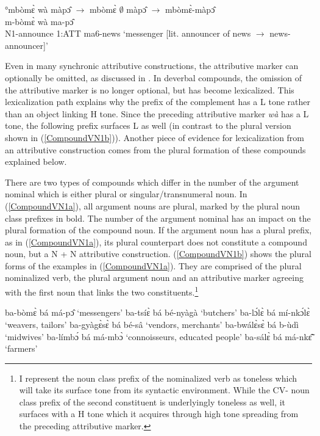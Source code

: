 \begin{exe}
\ex\label{CompoundVN} 
\gll  °mbòmɛ̀ wà màpɔ̂  $\rightarrow$ mbòmɛ̀ $\emptyset$ màpɔ̂  $\rightarrow$    mbòmɛ̀-màpɔ̂  \\
 	m-bòmɛ̀ wà ma-pɔ̂ \\
	N1-announce 1:ATT ma6-news 
\glt `messenger [lit. announcer of news $\rightarrow$ news-announcer]'
\end{exe}

\noindent Even in many synchronic attributive constructions, the attributive marker can optionally be omitted, as discussed in . In deverbal compounds, the omission of the attributive marker is no longer optional, but has become lexicalized. This lexicalization path explains why the prefix of the complement has a L tone rather than an object linking H tone. Since the preceding attributive marker {\itshape wà} has a L tone, the following prefix surfaces L as well (in contrast to the plural version shown in (\ref{CompoundVN1b})).   Another piece of evidence for lexicalization from an attributive construction comes from the plural formation of these compounds explained below. 


There are two types of  compounds which differ in the number of the argument nominal which is either plural or singular/transnumeral noun. In (\ref{CompoundVN1a}), all argument nouns are plural, marked by the plural noun class prefixes in bold.
The number of the argument nominal has an impact on the plural formation of the compound noun. If the argument noun has a plural prefix, as in (\ref{CompoundVN1a}), its plural counterpart does not constitute a compound noun, but a N + N attributive construction. (\ref{CompoundVN1b}) shows the plural forms of the examples in (\ref{CompoundVN1a}). They are comprised of the plural nominalized verb, the plural argument noun and an attributive marker agreeing with the first noun that links the two constituents.\footnote{I represent the noun class prefix of the nominalized verb as toneless which will take its surface tone from its syntactic environment. While the CV- noun class prefix of the second constituent is underlyingly toneless as well, it surfaces with a H tone which it acquires through high tone spreading from the preceding attributive marker.}

\begin{exe}
\ex\label{CompoundVN1b} 
\begin{xlist}
\ex ba-bòmɛ̀ bá má-pɔ̂ `messengers' 
\ex ba-tsíɛ̀ bá bé-nyàgà `butchers'
\ex ba-lɔ́lɛ̀ bá mí-nkɔ́lɛ̀ `weavers, tailors'
\ex ba-gyàgɛ̀sɛ̀ bá bé-sâ `vendors, merchants'
\ex ba-bwálɛ̀sɛ̀ bá b-ùdì `midwives'
\ex ba-límbɔ́ bá má-mbɔ̀ `connoisseurs, educated people'
\ex ba-sálɛ̀ bá má-nkɛ̃̂ `farmers'
\end{xlist}
\end{exe}

